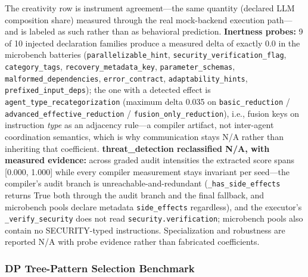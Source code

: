 \documentclass[
  11pt,
]{article}
\begin{document}
The creativity row is instrument agreement---the same quantity (declared
LLM composition share) measured through the real mock-backend execution
path---and is labeled as such rather than as behavioral prediction.
\textbf{Inertness probes:} 9 of 10 injected declaration families produce
a measured delta of exactly 0.0 in the microbench batteries
(\texttt{parallelizable\_hint}, \texttt{security\_verification\_flag},
\texttt{category\_tags}, \texttt{recovery\_metadata\_key},
\texttt{parameter\_schemas}, \texttt{malformed\_dependencies},
\texttt{error\_contract}, \texttt{adaptability\_hints},
\texttt{prefixed\_input\_deps}); the one with a detected effect is
\texttt{agent\_type\_recategorization} (maximum delta 0.035 on
\texttt{basic\_reduction} / \texttt{advanced\_effective\_reduction} /
\texttt{fusion\_only\_reduction}), i.e., fusion keys on instruction
\emph{type} as an adjacency rule---a compiler artifact, not inter-agent
coordination semantics, which is why communication stays N/A rather than
inheriting that coefficient. \textbf{threat\_detection reclassified N/A,
with measured evidence:} across graded audit intensities the extracted
score spans {[}0.000, 1.000{]} while every compiler measurement stays
invariant per seed---the compiler's audit branch is
unreachable-and-redundant (\texttt{\_has\_side\_effects} returns True
both through the audit branch and the final fallback, and microbench
pools declare metadata \texttt{side\_effects} regardless), and the
executor's \texttt{\_verify\_security} does not read
\texttt{security.verification}; microbench pools also contain no
SECURITY-typed instructions. Specialization and robustness are reported
N/A with probe evidence rather than fabricated coefficients.

\subsubsection{DP Tree-Pattern Selection
Benchmark}\label{dp-tree-pattern-selection-benchmark}
\end{document}
